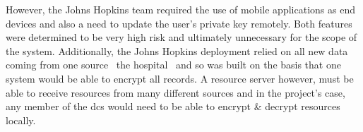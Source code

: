 However, the Johns Hopkins team required the use of mobile applications as end devices and also a need to update the user's private key remotely. Both features were determined to be very high risk and ultimately unnecessary for the scope of the \theResServer system. Additionally, the Johns Hopkins deployment relied on all new data coming from one source \textemdash\ the hospital \textemdash\ and so was built on the basis that one system would be able to encrypt all records. A resource server however, must be able to receive resources from many different sources and in the project's case, any member of the \acrshort{dcs} would need to be able to encrypt \& decrypt resources locally.
